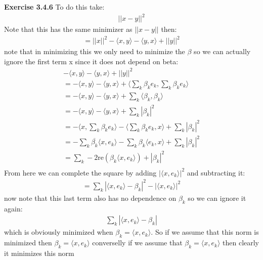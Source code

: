 \documentclass[12pt]{article}
\newenvironment{exercise}[1]{\vspace{.1in}\noindent\textbf{Exercise #1 \hspace{.05em}}}{}
\theoremstyle{definition}
\theoremstyle{remark}
\begin{document}
\begin{exercise}{3.4.6}
	To do this take:
	\begin{align}
		||x-y||^2
	\end{align}
	Note that this has the same minimizer as $||x-y||$ then:
	\begin{align}
		=||x||^2-\langle x, y\rangle -\langle y, x\rangle +||y||^2
	\end{align}
	note that in minimizing this we only need to minimize the $\beta$ so we can actually ignore the first term x since it does not depend on beta:
	\begin{align}
		-\langle x,y\rangle -\langle y,x\rangle +||y||^2                                                      \\
		=-\langle x,y\rangle -\langle y,x\rangle + \langle \sum_k\beta_k e_k,\sum_k \beta_k e_k\rangle        \\
		=-\langle x,y\rangle -\langle y,x\rangle + \sum_k\langle \beta_k , \beta_k \rangle                    \\
		=-\langle x,y\rangle -\langle y,x\rangle + \sum_k|\beta_k|^2                                          \\
		=-\langle x,\sum_k\beta_ke_k\rangle -\langle \sum_k\beta_k e_k,x\rangle +\sum_k|\beta_k|^2            \\
		=- \sum_k\overline{\beta_k}\langle x,e_k\rangle -\sum_k\beta_k\langle e_k,x\rangle +\sum_k|\beta_k|^2 \\
		= \sum_k -2\text{re}(\beta_k\langle x,e_k\rangle)  +|\beta_k|^2                                       \\
	\end{align}
	From here we can complete the square by adding $|\langle x,e_k\rangle |^2$ and subtracting it:
	\begin{align}
		=\sum_k |\langle x,e_k\rangle-\beta_k|^2-|\langle x, e_k\rangle |^2
	\end{align}
	now note that this last term also has no dependence on $\beta_k$ so we can ignore it again:
	\begin{align}
		\sum_k|\langle x,e_k\rangle -\beta_k|
	\end{align}
	which  is obviously minimized when $\beta_k = \langle x, e_k\rangle$. So if we assume that this norm is minimized then $\beta_k=\langle x, e_k\rangle$ converselly if we assume that $\beta_k=\langle x, e_k\rangle$ then clearly it minimizes this norm

\end{exercise}
\end{document}
